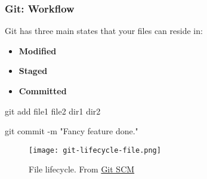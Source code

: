 \begin{frame}

\frametitle{Git: Workflow}

\begin{multicols}{2}
Git has three main states that your files can reside in:

\begin{itemize}[<+(1)->]
\item \textbf{Modified}
\item \textbf{Staged}
\item \textbf{Committed}
\end{itemize}

\columnbreak

git add file1 file2 dir1 dir2

git commit -m "Fancy feature done."


\end{multicols}

\begin{figure}
\centering
\texttt{[image: git-lifecycle-file.png]}
\caption{File lifecycle. From \href{https://git-scm.com/book/en/v2/Git-Basics-Recording-Changes-to-the-Repository}{Git SCM}}
\end{figure}

\end{frame}